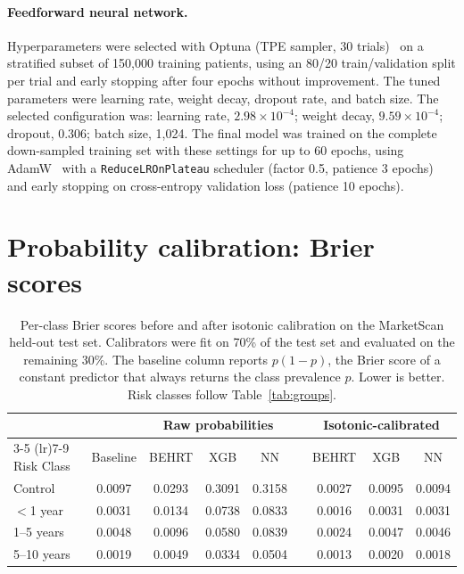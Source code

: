 \documentclass[12pt]{article}
\begin{document}
\paragraph{Feedforward neural network.}
Hyperparameters were selected with Optuna (TPE sampler, 30 trials)~\citep{Akiba2019Optuna} on a stratified subset of 150{,}000 training patients, using an 80/20 train/validation split per trial and early stopping after four epochs without improvement. The tuned parameters were learning rate, weight decay, dropout rate, and batch size. The selected configuration was: learning rate, $2.98 \times 10^{-4}$; weight decay, $9.59 \times 10^{-4}$; dropout, 0.306; batch size, 1{,}024. The final model was trained on the complete down-sampled training set with these settings for up to 60 epochs, using AdamW~\citep{Loshchilov2019AdamW} with a \texttt{ReduceLROnPlateau} scheduler (factor 0.5, patience 3 epochs) and early stopping on cross-entropy validation loss (patience 10 epochs).

\section{Probability calibration: Brier scores}
\label{supp:brier}

\begin{table}[H]
\centering
\caption{Per-class Brier scores before and after isotonic calibration on the MarketScan held-out test set. Calibrators were fit on 70\% of the test set and evaluated on the remaining 30\%. The baseline column reports $p(1-p)$, the Brier score of a constant predictor that always returns the class prevalence $p$. Lower is better. Risk classes follow Table~\ref{tab:groups}.}
\label{tab:brier_calibration_comparison}
\begin{tabular}{lcccccccc}
\toprule
 & & \multicolumn{3}{c}{Raw probabilities} & & \multicolumn{3}{c}{Isotonic-calibrated} \\
\cmidrule(lr){3-5} \cmidrule(lr){7-9}
Risk Class & Baseline & BEHRT & XGB & NN & & BEHRT & XGB & NN \\
\midrule
Control     & 0.0097 & 0.0293 & 0.3091 & 0.3158 & & 0.0027 & 0.0095 & 0.0094 \\
$<$1 year   & 0.0031 & 0.0134 & 0.0738 & 0.0833 & & 0.0016 & 0.0031 & 0.0031 \\
1--5 years  & 0.0048 & 0.0096 & 0.0580 & 0.0839 & & 0.0024 & 0.0047 & 0.0046 \\
5--10 years & 0.0019 & 0.0049 & 0.0334 & 0.0504 & & 0.0013 & 0.0020 & 0.0018 \\
\bottomrule
\end{tabular}
\end{table}
\end{document}

